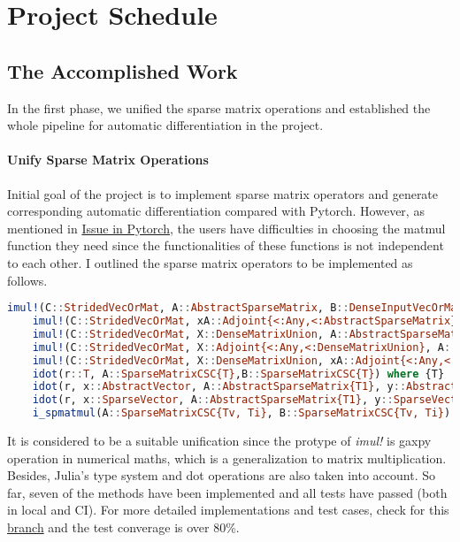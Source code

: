 
\vspace{0.5cm}  

\section{Project Schedule}
\subsection{The Accomplished Work}
In the first phase, we unified the sparse matrix operations and established 
the whole pipeline for automatic differentiation in the project.
\paragraph{Unify Sparse Matrix Operations} 
Initial goal of the project is to implement sparse matrix operators and generate corresponding 
automatic differentiation compared with Pytorch. However, as mentioned in 
\href{https://github.com/pytorch/pytorch/issues/45897}{Issue in Pytorch}, the users have 
difficulties in choosing the matmul function they need since the functionalities of these functions 
is not independent to each other. I outlined the sparse matrix operators to be implemented as follows. 
\begin{lstlisting}[language=Julia]
    imul!(C::StridedVecOrMat, A::AbstractSparseMatrix, B::DenseInputVecOrMat, alpha::Number, beta::Number)
    imul!(C::StridedVecOrMat, xA::Adjoint{<:Any,<:AbstractSparseMatrix}, B::DenseInputVecOrMat, alpha::Number, beta::Number)
    imul!(C::StridedVecOrMat, X::DenseMatrixUnion, A::AbstractSparseMatrix, alpha::Number, beta::Number)
    imul!(C::StridedVecOrMat, X::Adjoint{<:Any,<:DenseMatrixUnion}, A::AbstractSparseMatrix, alpha::Number, beta::Number)
    imul!(C::StridedVecOrMat, X::DenseMatrixUnion, xA::Adjoint{<:Any,<:AbstractSparseMatrix}, alpha::Number, beta::Number)
    idot(r::T, A::SparseMatrixCSC{T},B::SparseMatrixCSC{T}) where {T}
    idot(r, x::AbstractVector, A::AbstractSparseMatrix{T1}, y::AbstractVector{T2}) where {T1, T2}
    idot(r, x::SparseVector, A::AbstractSparseMatrix{T1}, y::SparseVector{T2}) where {T1, T2}
    i_spmatmul(A::SparseMatrixCSC{Tv, Ti}, B::SparseMatrixCSC{Tv, Ti}) where {Tv, Ti}
\end{lstlisting}
It is considered to be a suitable unification since the protype of \textit{imul!} is 
gaxpy operation in numerical maths, which is a generalization to matrix multiplication.
Besides, Julia's type system and dot operations are also taken into account.      
So far, seven of the methods have been implemented and all tests have passed (both in local and CI).
For more detailed implementations and test cases, check for this 
\href{https://github.com/jieli-matrix/NiSparseArrays.jl/tree/dev}{branch} and  
the test converage is over 80\%.  

